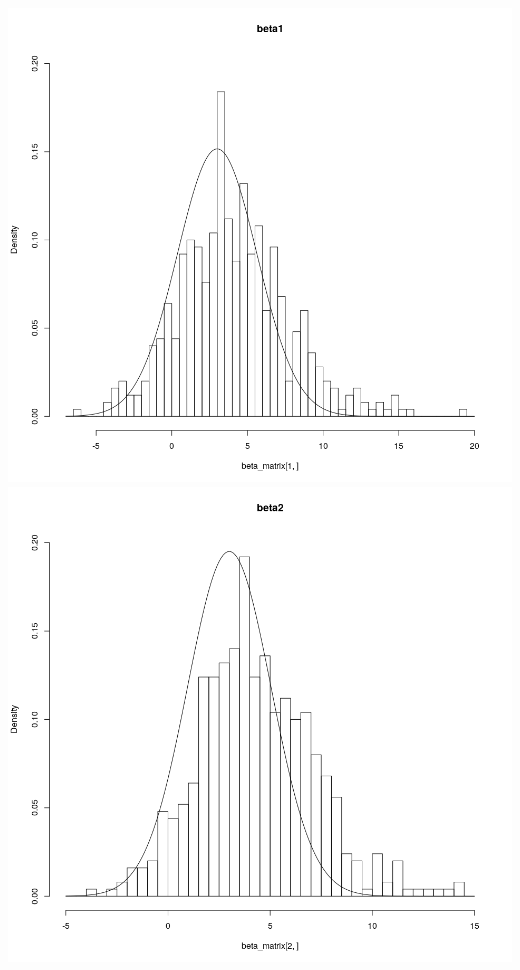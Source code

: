\documentclass[a4paper,11pt]{article}
\begin{document}
\includegraphics[scale=.35]{531.png} 
\includegraphics[scale=.35]{532.png} 
\end{document}
